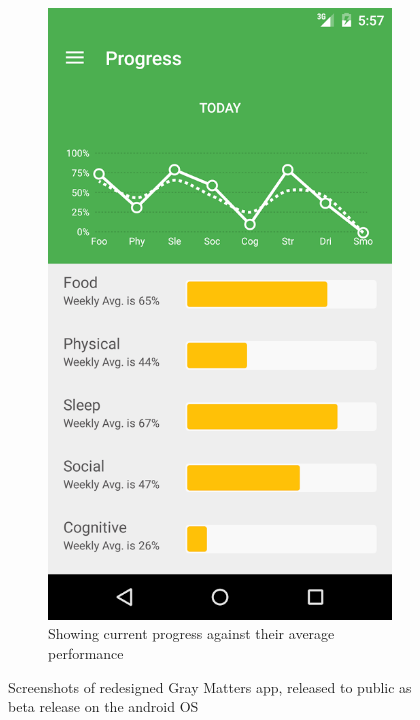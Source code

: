 \begin{figure}[h]
\begin{subfigure}[t]{0.3\textwidth}
        \includegraphics[width=\textwidth]{Files/prevention-study-3/figures/gm-new-performance}
        \caption{Showing current progress against their average performance}
        \label{fig: gm-new-performance}
    \end{subfigure}
    \caption{Screenshots of redesigned Gray Matters app, released to public as beta release on the android OS}
    \label{fig: graymatters-new}
\end{figure}

